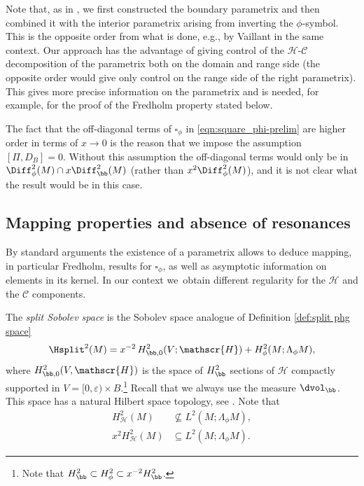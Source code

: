 \begin{Rem}
Note that, as in \cite{grieser-para}, we first constructed the boundary parametrix and then combined it with the interior parametrix arising from inverting the $\phi$-symbol. This is the opposite order from what is done, e.g., by
Vaillant \cite{vaillant} in the same context. Our approach has the advantage of giving control of the $\mathscr{H}$-$\mathscr{C}$ decomposition of the parametrix both on the domain and range side (the opposite order would give only control on the range side of the right parametrix). This gives more precise information on the parametrix and is needed, for example, for the proof of the Fredholm property stated below.
\end{Rem}
\begin{Rem}\label{Dpi-condition}
The fact that the off-diagonal terms of $\square_\phi$ in \eqref{eqn:square_phi-prelim} are higher order in terms of $x\to0$ is the reason that we impose the assumption $[\Pi,D_B]=0$. Without this assumption the off-diagonal terms would only be in $\Diff^2_\phi(M)\cap x\Diff^2_\bb(M)$ (rather than $x^2\Diff^2_\phi(M)$), and it is not clear what the result would be in this case.
\end{Rem}

\subsection{Mapping properties and absence of resonances}
By standard arguments the existence of a parametrix allows to deduce mapping, in particular Fredholm, results for $\square_\phi$, as well as asymptotic information on elements in its kernel. In our context we~obtain different regularity for the $\mathscr{H}$ and the $\mathscr{C}$ components.

The \emph{split Sobolev space} is the Sobolev space analogue of Definition \ref{def:split phg space}
\begin{equation}
\label{eqn:def Hsplit}
\Hsplit^2(M) = x^{-2}\,H^2_{\bb,0}(V;\mathscr{H}) + H^2_\phi(M; \Lambda_\phi M),
\end{equation}
where $H^2_{\bb,0}(V,\mathscr{H})$ is the space of $H^2_\bb$ sections of
$\mathscr{H}$ compactly supported in $V=[0,\varepsilon) \times B$.\footnote{Note that $H^2_\bb\subset H^2_\phi\subset x^{-2}H^2_\bb$.}
Recall that we always use the measure $\dvol_\bb$.
This space has a natural Hilbert space topology, see
\cite[\S 6.1, Def.\,7]{grieser-para}. Note that
\begin{equation}\label{H-split-inclusions}
\begin{split}
H^2_{\mathscr{H}}(M) &\not\subseteq
L^2(M; \Lambda_\phi M), \\
x^2H^2_{\mathscr{H}}(M) &\subseteq
L^2(M; \Lambda_\phi M).
\end{split}
\end{equation}

